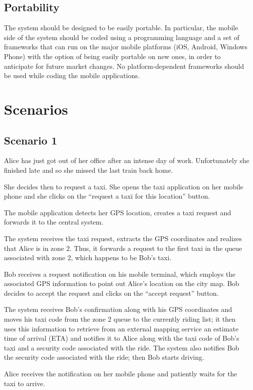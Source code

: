 \subsection{Portability}
The system should be designed to be easily portable. In particular, the mobile side of the system should be coded using a programming language and a set of frameworks that can run on the major mobile platforms (iOS, Android, Windows Phone) with the option of being easily portable on new ones, in order to anticipate for future market changes. No platform-dependent frameworks should be used while coding the mobile applications.


\section{Scenarios}
\subsection{Scenario 1}
Alice has just got out of her office after an intense day of work. Unfortunately she finished late and so she missed the last train back home.

She decides then to request a taxi. She opens the taxi application on her mobile phone and she clicks on the ``request a taxi for this location'' button.

The mobile application detects her GPS location, creates a taxi request and forwards it to the central system.

The system receives the taxi request, extracts the GPS coordinates and realizes that Alice is in zone 2. Thus, it forwards a request to the first taxi in the queue associated with zone 2, which happens to be Bob's taxi.

Bob receives a request notification on his mobile terminal, which employs the associated GPS information to point out Alice's location on the city map. Bob decides to accept the request and clicks on the ``accept request'' button.

The system receives Bob's confirmation along with his GPS coordinates and moves his taxi code from the zone 2 queue to the currently riding list; it then uses this information to retrieve from an external mapping service an estimate time of arrival (ETA) and notifies it to Alice along with the taxi code of Bob's taxi and a security code associated with the ride. The system also notifies Bob the security code associated with the ride; then Bob starts driving.

Alice receives the notification on her mobile phone and patiently waits for the taxi to arrive.

